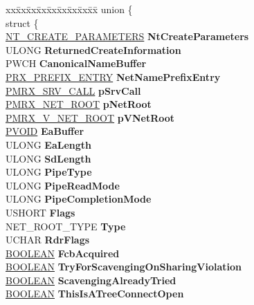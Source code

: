 \begin{DoxyCompactItemize}
\begin{tabbing}
\end{tabbing}\item 
\mbox{\label{struct___r_x___c_o_n_t_e_x_t_a166f176450702bc762c03123416d9991}} 
\begin{tabbing}
xx\=xx\=xx\=xx\=xx\=xx\=xx\=xx\=xx\=\kill
union \{\\
\>struct \{\\
\>\>\hyperlink{struct___n_t___c_r_e_a_t_e___p_a_r_a_m_e_t_e_r_s}{NT\_CREATE\_PARAMETERS} {\bfseries NtCreateParameters}\\
\>\>ULONG {\bfseries ReturnedCreateInformation}\\
\>\>PWCH {\bfseries CanonicalNameBuffer}\\
\>\>\hyperlink{struct___r_x___p_r_e_f_i_x___e_n_t_r_y}{PRX\_PREFIX\_ENTRY} {\bfseries NetNamePrefixEntry}\\
\>\>\hyperlink{struct___m_r_x___s_r_v___c_a_l_l__}{PMRX\_SRV\_CALL} {\bfseries pSrvCall}\\
\>\>\hyperlink{struct___m_r_x___n_e_t___r_o_o_t__}{PMRX\_NET\_ROOT} {\bfseries pNetRoot}\\
\>\>\hyperlink{struct___m_r_x___v___n_e_t___r_o_o_t__}{PMRX\_V\_NET\_ROOT} {\bfseries pVNetRoot}\\
\>\>\hyperlink{interfacevoid}{PVOID} {\bfseries EaBuffer}\\
\>\>ULONG {\bfseries EaLength}\\
\>\>ULONG {\bfseries SdLength}\\
\>\>ULONG {\bfseries PipeType}\\
\>\>ULONG {\bfseries PipeReadMode}\\
\>\>ULONG {\bfseries PipeCompletionMode}\\
\>\>USHORT {\bfseries Flags}\\
\>\>NET\_ROOT\_TYPE {\bfseries Type}\\
\>\>UCHAR {\bfseries RdrFlags}\\
\>\>\hyperlink{_processor_bind_8h_a112e3146cb38b6ee95e64d85842e380a}{BOOLEAN} {\bfseries FcbAcquired}\\
\>\>\hyperlink{_processor_bind_8h_a112e3146cb38b6ee95e64d85842e380a}{BOOLEAN} {\bfseries TryForScavengingOnSharingViolation}\\
\>\>\hyperlink{_processor_bind_8h_a112e3146cb38b6ee95e64d85842e380a}{BOOLEAN} {\bfseries ScavengingAlreadyTried}\\
\>\>\hyperlink{_processor_bind_8h_a112e3146cb38b6ee95e64d85842e380a}{BOOLEAN} {\bfseries ThisIsATreeConnectOpen}\\

\end{tabbing}
\end{DoxyCompactItemize}
